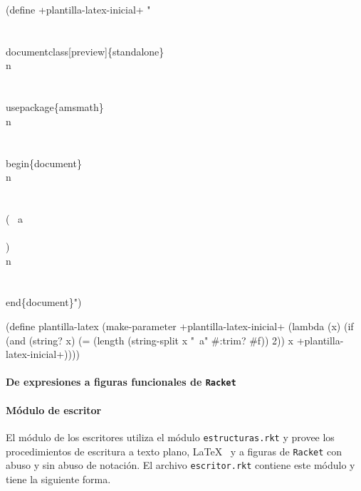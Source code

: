 \documentclass[letterpaper,twoside,openright,11pt]{book}
\begin{document}
\nwenddocs{}\endmoddef
(define +plantilla-latex-inicial+
  "\\
\\\\documentclass[preview]\{standalone\}\\n\\
\\\\usepackage\{amsmath\}\\n\\
\\\\begin\{document\}\\n\\
\\\\( ~a \\\\)\\n\\
\\\\end\{document\}")

(define plantilla-latex
  (make-parameter
   +plantilla-latex-inicial+
   (lambda (x)
     (if (and (string? x) (= (length (string-split x "~a" #:trim? #f)) 2))
         x
         +plantilla-latex-inicial+))))

\eatline
{}\nwendcode{}\nwdocspar

\nwenddocs{}\paragraph{De expresiones a figuras funcionales de {\tt{}Racket}}

\nwenddocs{}\paragraph{Módulo de escritor} El módulo de los escritores utiliza el módulo {\tt{}estructuras.rkt} y provee los procedimientos de escritura a texto plano, \LaTeX~ y a figuras de {\tt{}Racket} con abuso y sin abuso de notación. El archivo {\tt{}escritor.rkt} contiene este módulo y tiene la siguiente forma.
\end{document}
